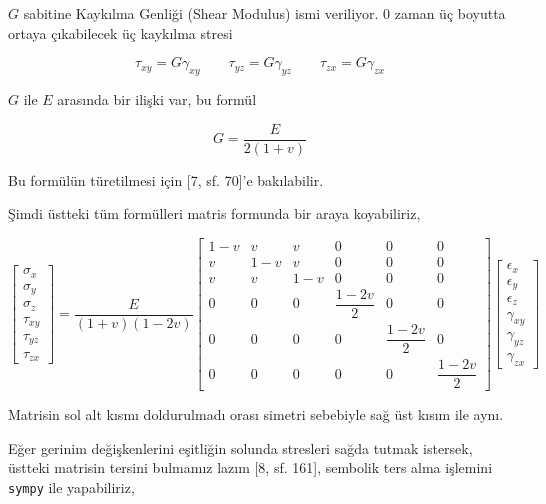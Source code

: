 \documentclass[12pt,fleqn]{article}\usepackage{../../common}
\begin{document}
$G$ sabitine Kaykılma Genliği (Shear Modulus) ismi veriliyor. 0 zaman üç boyutta
ortaya çıkabilecek üç kaykılma stresi

$$
\tau_{xy} = G \gamma_{xy} \qquad 
\tau_{yz} = G \gamma_{yz} \qquad 
\tau_{zx} = G \gamma_{zx}
$$

$G$ ile $E$ arasında bir ilişki var, bu formül

$$
G = \frac{E}{2(1+v)}
$$

Bu formülün türetilmesi için [7, sf. 70]'e bakılabilir.

Şimdi üstteki tüm formülleri matris formunda bir araya koyabiliriz,

$$
\left[\begin{array}{c}
\sigma_x \\ \sigma_y \\ \sigma_z \\ \tau_{xy} \\ \tau_{yz} \\ \tau_{zx}
\end{array}\right] =
\frac{E}{(1+v)(1-2v)}
\left[\begin{array}{cccccc}
1-v &  v  &  v  &            0      &               0  &  0  \\
 v  & 1-v &  v  &            0      &               0  &  0  \\
 v  &  v  & 1-v &            0      &               0  &  0  \\
 0  &  0  &  0  & \dfrac{1-2v}{2}   &               0  &  0  \\
 0  &  0  &  0  &            0      &  \dfrac{1-2v}{2} &  0  \\
 0  &  0  &  0  &            0      &               0  &  \dfrac{1-2v}{2} 
\end{array}\right]
\left[\begin{array}{c}
\epsilon_x \\ \epsilon_y \\ \epsilon_z \\ \gamma_{xy} \\ \gamma_{yz} \\ \gamma_{zx}
\end{array}\right]
$$

Matrisin sol alt kısmı doldurulmadı orası simetri sebebiyle sağ üst kısım ile
aynı.

Eğer gerinim değişkenlerini eşitliğin solunda stresleri sağda tutmak istersek,
üstteki matrisin tersini bulmamız lazım [8, sf. 161], sembolik ters alma
işlemini \verb!sympy! ile yapabiliriz,
\end{document}
